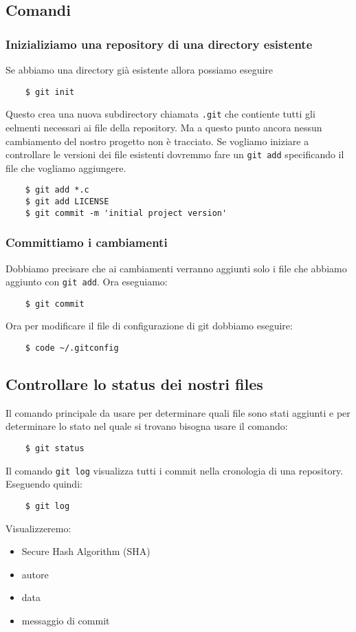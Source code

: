 \documentclass{article}
\begin{document}
\subsection*{Comandi}
\subsubsection*{Inizializiamo una repository di una directory esistente}
Se abbiamo una directory già esistente allora possiamo eseguire
\begin{verbatim}
    $ git init
\end{verbatim}
Questo crea una nuova subdirectory chiamata \texttt{.git} che contiente tutti gli eelmenti necessari ai file della repository. Ma a questo punto ancora nessun cambiamento del nostro progetto non è tracciato.
Se vogliamo iniziare a controllare le versioni dei file esistenti dovremmo fare un \texttt{git add} specificando il file che vogliamo aggiungere.
\begin{verbatim}
    $ git add *.c
    $ git add LICENSE
    $ git commit -m 'initial project version'
\end{verbatim}



\subsubsection*{Committiamo i cambiamenti}
Dobbiamo precisare che ai cambiamenti verranno aggiunti solo i file che abbiamo aggiunto con \texttt{git add}. Ora eseguiamo: 
\begin{verbatim}
    $ git commit
\end{verbatim}

Ora per modificare il file di configurazione di git dobbiamo eseguire:

\begin{verbatim}
    $ code ~/.gitconfig
\end{verbatim}


\subsection*{Controllare lo status dei nostri files}
Il comando principale da usare per determinare quali file sono stati aggiunti e per determinare lo stato nel quale si trovano bisogna usare il comando:
\begin{verbatim}
    $ git status
\end{verbatim}

Il comando \texttt{git log} visualizza tutti i commit nella cronologia di una repository. Eseguendo quindi:
\begin{verbatim}
    $ git log
\end{verbatim}
Visualizzeremo:
\begin{itemize}
    \item Secure Hash Algorithm (SHA)
    \item autore
    \item data
    \item messaggio di commit
\end{itemize}
\end{document}

